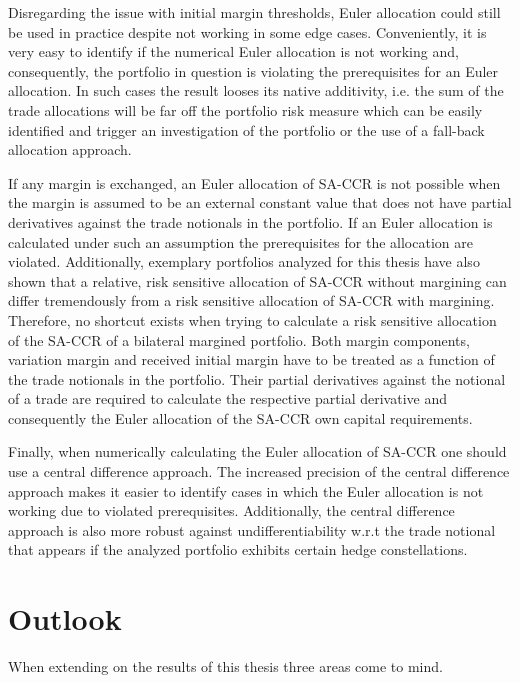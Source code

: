 \documentclass[../Thesis_AHoecherl.tex]{subfiles}
\begin{document}
Disregarding the issue with initial margin thresholds, Euler allocation could still be used in practice despite not working in some edge cases. 
Conveniently, it is very easy to identify if the numerical Euler allocation is not working and, consequently, the portfolio in question is violating the prerequisites for an Euler allocation.
In such cases the result looses its native additivity, i.e. the sum of the trade allocations will be far off the portfolio risk measure which can be easily identified and trigger an investigation of the portfolio or the use of a fall-back allocation approach.

If any margin is exchanged, an Euler allocation of \gls{SA-CCR} is not possible when the margin is assumed to be an external constant value that does not have partial derivatives against the trade notionals in the portfolio.
If an Euler allocation is calculated under such an assumption the prerequisites for the allocation are violated. Additionally, exemplary portfolios analyzed for this thesis have also shown that a relative, risk sensitive allocation of \gls{SA-CCR} without margining can differ tremendously from a risk sensitive allocation of \gls{SA-CCR} with margining.
Therefore, no shortcut exists when trying to calculate a risk sensitive allocation of the \gls{SA-CCR} of a bilateral margined portfolio. 
Both margin components, variation margin and received initial margin have to be treated as a function of the trade notionals in the portfolio. Their partial derivatives against the notional of a trade are required to calculate the respective partial derivative and consequently the Euler allocation of the \gls{SA-CCR} own capital requirements.

Finally, when numerically calculating the Euler allocation of \gls{SA-CCR} one should use a central difference approach. The increased precision of the central difference approach makes it easier to identify cases in which the Euler allocation is not working due to violated prerequisites. Additionally, the central difference approach is also more robust against undifferentiability w.r.t the trade notional that appears if the analyzed portfolio exhibits certain hedge constellations.

\section{Outlook\label{sec:Outlook}}

When extending on the results of this thesis three areas come to mind.
\end{document}

